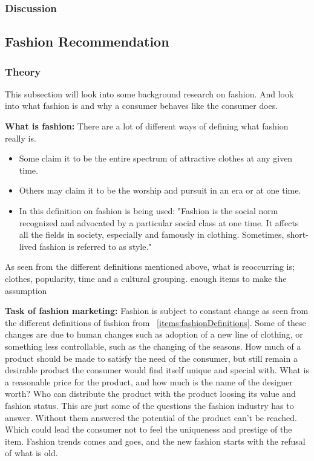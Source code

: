 \subsubsection{Discussion}


\subsection{Fashion Recommendation}


\subsubsection{Theory}
This subsection will look into some background research on fashion.
And look into what fashion is and why a consumer behaves like the consumer does.

\textbf{What is fashion:}
There are a lot of different ways of defining what fashion really is.

\begin{itemize}
    \item Some claim it to be the entire spectrum of attractive clothes at any given time.
    \item Others may claim it to be the worship and pursuit in an era or at one
    time.
    \item In \cite{Fang2012} this definition on fashion is being used: "Fashion is
    the social norm recognized and advocated by a particular social class at one
    time. It affects all the fields in society, especially and famously in
    clothing. Sometimes, short-lived fashion is referred to as style."
    \label{items:fashionDefinitions}
\end{itemize}

As seen from the different definitions mentioned above, what is reoccurring is;
clothes, popularity, time and a cultural grouping.
enough items to make the assumption

\textbf{Task of fashion marketing:}
Fashion is subject to constant change as seen from the different definitions of fashion from ~\ref{items:fashionDefinitions}.
Some of these changes are due to human changes such as adoption of a new line of clothing, or something less controllable, such as the changing of the seasons.
How much of a product should be made to satisfy the need of the consumer, but still remain a desirable product the consumer would find itself unique and special with.
What is a reasonable price for the product, and how much is the name of the designer worth?
Who can distribute the product with the product loosing its value and fashion status.
This are just some of the questions the fashion industry has to answer.
Without them answered the potential of the product can't be reached.
Which could lead the consumer not to feel the uniqueness and prestige of the item.
Fashion trends comes and goes, and the new fashion starts with the refusal of what is old.

